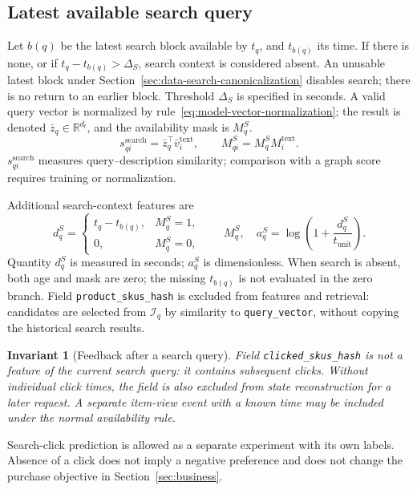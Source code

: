 \documentclass[12pt,a4paper]{article}
\newcommand{\code}[1]{{\ttfamily\small\nolinkurl{#1}}}
\newcommand{\R}{\mathbb R}
\theoremstyle{plainru}
\newtheorem{invariant}{Invariant}[section]
\begin{document}
\subsection{Latest available search query}

Let $b(q)$ be the latest search block available by $t_q$,
and $t_{b(q)}$ its time. If there is none, or if
$t_q-t_{b(q)}>\Delta_S$, search context is considered absent.
An unusable latest block under
Section~\ref{sec:data-search-canonicalization} disables search;
there is no return to an earlier block.
Threshold $\Delta_S$ is specified in seconds. A valid query vector
is normalized by rule~\eqref{eq:model-vector-normalization};
the result is denoted $\bar z_q\in\R^{d_t}$,
and the availability mask is $M_q^S$.
\begin{equation}\label{eq:model-search-score}
s_{qi}^{\mathrm{search}}=\bar z_q^\top\bar v_i^{\mathrm{text}},\qquad
M_{qi}^S=M_q^S M_i^{\mathrm{text}}.
\end{equation}
$s_{qi}^{\mathrm{search}}$ measures query--description similarity;
comparison with a graph score requires training or normalization.

Additional search-context features are
\begin{equation}\label{eq:model-search-features}
d_q^S=\begin{cases}
t_q-t_{b(q)},&M_q^S=1,\\
0,&M_q^S=0,
\end{cases}
\qquad M_q^S,\quad
a_q^S=\log\!\left(1+\frac{d_q^S}{t_{\mathrm{unit}}}\right).
\end{equation}
Quantity $d_q^S$ is measured in seconds; $a_q^S$ is dimensionless.
When search is absent, both age and mask are zero; the missing
$t_{b(q)}$ is not evaluated in the zero branch.
Field \code{product_skus_hash} is excluded from features and retrieval:
candidates are selected from $\mathcal I_q$ by similarity to \code{query_vector},
without copying the historical search results.

\begin{invariant}[Feedback after a search query]
Field \code{clicked_skus_hash} is not a feature of the current
search query: it contains subsequent clicks.
Without individual click times, the field is also excluded
from state reconstruction for a later request.
A separate item-view event with a known time
may be included under the normal availability rule.
\end{invariant}

Search-click prediction is allowed as a separate experiment
with its own labels. Absence of a click does not imply a negative preference
and does not change the purchase objective in Section~\ref{sec:business}.
\end{document}
